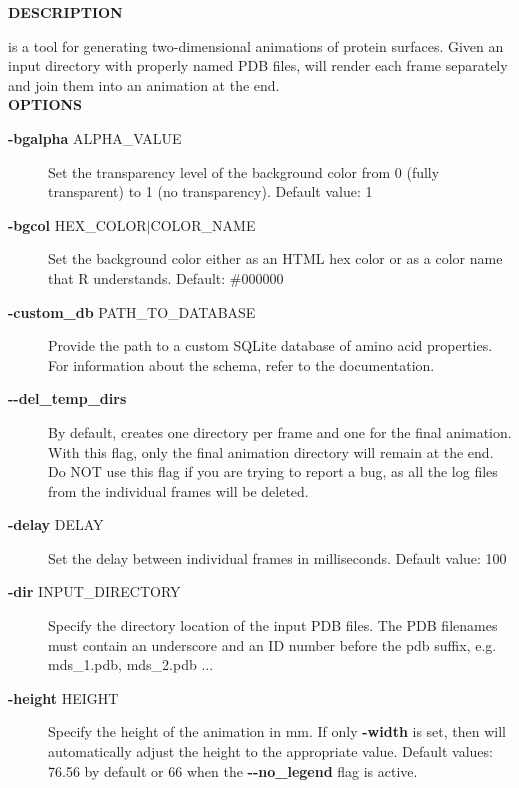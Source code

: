 \documentclass[12pt,a4paper]{article}
\begin{document}
\textbf{\large{DESCRIPTION}}

 is a tool for generating two-dimensional animations of 
protein surfaces. Given an input directory with properly named PDB files, 
 will render each frame separately and join them into an animation 
at the end.\\

\textbf{\large{OPTIONS}}
\begin{description}

\item[{\textbf{-bgalpha} ALPHA\_VALUE}] \mbox{}

Set the transparency level of the background color from 0 (fully transparent) to 1 (no transparency). Default value: 1

\item[{\textbf{-bgcol} HEX\_COLOR$|$COLOR\_NAME}] \mbox{}

Set the background color either as an HTML hex color or as a color name that R understands. Default: \#000000

\item[{\textbf{-custom\_db} PATH\_TO\_DATABASE}] \mbox{}

Provide the path to a custom SQLite database of amino acid properties. For information about the schema, refer to the documentation.

\item[{\textbf{-{}-del\_temp\_dirs}}] \mbox{}

By default,  creates one directory per frame and one for the final animation. With this flag, only the final animation directory will remain at the end. Do NOT use this flag if you are trying to report a bug, as all the log files from the individual frames will be deleted.

\item[{\textbf{-delay} DELAY}] \mbox{}

Set the delay between individual frames in milliseconds. Default value: 100

\item[{\textbf{-dir} INPUT\_DIRECTORY}] \mbox{}

Specify the directory location of the input PDB files. The PDB filenames must contain an underscore and an ID number before the pdb suffix, e.g. mds\_1.pdb, mds\_2.pdb ...

\item[{\textbf{-height} HEIGHT}] \mbox{}

Specify the height of the animation in mm. If only \textbf{-width} is set, then  will automatically adjust the height to the appropriate value. Default values: 76.56 by default or 66 when the \textbf{-{}-no\_legend} flag is active.


\end{description}
\end{document}
